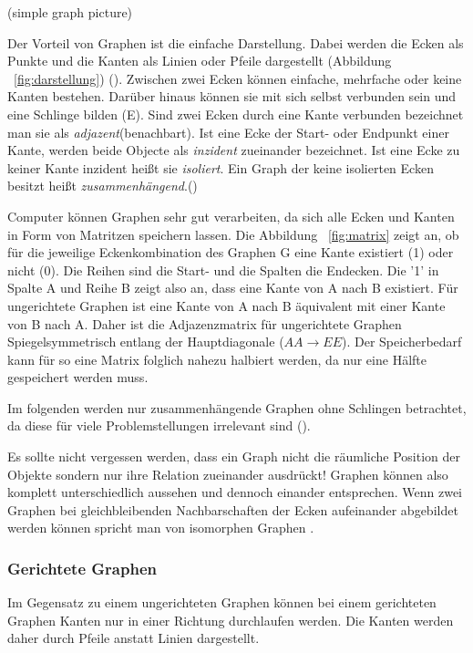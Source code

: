\documentclass[10pt,a4paper]{article}
\begin{document}
(simple graph picture)

Der Vorteil von Graphen ist die einfache Darstellung. Dabei werden die Ecken als Punkte und die Kanten als Linien oder Pfeile dargestellt (Abbildung ~\ref{fig:darstellung}) (\cite[49]{kurt}). Zwischen zwei Ecken können einfache, mehrfache oder keine Kanten bestehen. Darüber hinaus können sie mit sich selbst verbunden sein und eine Schlinge bilden (E). Sind zwei Ecken durch eine Kante verbunden bezeichnet man sie als \textit{adjazent}(benachbart). Ist eine Ecke der Start- oder Endpunkt einer Kante, werden beide Objecte als \textit{inzident} zueinander bezeichnet. Ist eine Ecke zu keiner Kante inzident heißt sie \textit{isoliert}. Ein Graph der keine isolierten Ecken besitzt heißt \textit{zusammenhängend}.(\cite[4--5]{theory}) \par

Computer können Graphen sehr gut verarbeiten, da sich alle Ecken und Kanten in Form von Matritzen speichern lassen. Die Abbildung ~\ref{fig:matrix} zeigt an, ob für die jeweilige Eckenkombination des Graphen G eine Kante existiert (1) oder nicht (0). Die Reihen sind die Start- und die Spalten die Endecken. Die '1' in Spalte A und Reihe B zeigt also an, dass eine Kante von A nach B existiert. Für ungerichtete Graphen ist eine Kante von A nach B äquivalent mit einer Kante von B nach A. Daher ist die Adjazenzmatrix für ungerichtete Graphen Spiegelsymmetrisch entlang der Hauptdiagonale ($AA \rightarrow EE$). Der Speicherbedarf kann für so eine Matrix folglich nahezu halbiert werden, da nur eine Hälfte gespeichert werden muss.

Im folgenden werden nur zusammenhängende Graphen ohne Schlingen betrachtet, da diese für viele Problemstellungen irrelevant sind (\cite[4f]{theory}).

Es sollte nicht vergessen werden, dass ein Graph nicht die räumliche Position der Objekte sondern nur ihre Relation zueinander ausdrückt! Graphen können also komplett unterschiedlich aussehen und dennoch einander entsprechen. Wenn zwei Graphen bei gleichbleibenden Nachbarschaften der Ecken aufeinander abgebildet werden können spricht man von isomorphen Graphen \cite[106]{theory}.

\subsubsection{Gerichtete Graphen}
Im Gegensatz zu einem ungerichteten Graphen können bei einem gerichteten Graphen Kanten nur in einer Richtung durchlaufen werden. Die Kanten werden daher durch Pfeile anstatt Linien dargestellt.
\end{document}
